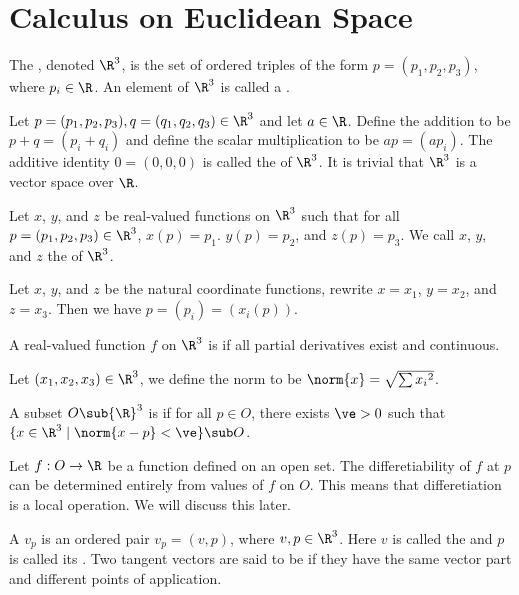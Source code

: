 \documentclass[10pt]{article}
\begin{document}
\hsetup
\htoc
\hmain
\par
\section{Calculus on Euclidean Space}
\begin{definition}
    The , denoted ${\R}^{3}$, is the set of ordered triples of the form $p=({p}_{1},{p}_{2},{p}_{3})$, where ${p}_{i}\in\R$. An element of ${\R}^{3}$ is called a .
\end{definition}
\par
Let $p=({p}_{1},{p}_{2},{p}_{3}),q=({q}_{1},{q}_{2},{q}_{3})\in{\R}^{3}$ and let $a\in\R$. Define the addition to be $p+q=({p}_{i}+{q}_{i})$ and define the scalar multiplication to be $ap=(a{p}_{i})$. The additive identity $0=(0,0,0)$ is called the  of ${\R}^{3}$. It is trivial that ${\R}^{3}$ is a vector space over $\R$.
\begin{definition}
    Let $x$, $y$, and $z$ be real-valued functions on ${\R}^{3}$ such that for all $p=({p}_{1},{p}_{2},{p}_{3})\in{\R}^{3}$, $x(p)={p}_{1}$. $y(p)={p}_{2}$, and $z(p)={p}_{3}$. We call $x$, $y$, and $z$ the  of ${\R}^{3}$.
\end{definition}
\par
Let $x$, $y$, and $z$ be the natural coordinate functions, rewrite $x={x}_{1}$, $y={x}_{2}$, and $z={x}_{3}$. Then we have $p=({p}_{i})=({x}_{i}(p))$.
\begin{definition}
    A real-valued function $f$ on ${\R}^{3}$ is  if all partial derivatives exist and continuous.
\end{definition}
\par
Let $({x}_{1},{x}_{2},{x}_{3})\in{\R}^{3}$, we define the norm to be $\norm{x}=\sqrt{\sum{{x}_{i}}^{2}}$.
\begin{definition}
    A subset $O\sub{\R}^{3}$ is  if for all $p\in O$, there exists $\ve>0$ such that $\{x\in{\R}^{3}\mid\norm{x-p}<\ve\}\sub O$. 
\end{definition}
\par
Let $f:O\to\R$ be a function defined on an open set. The differetiability of $f$ at $p$ can be determined entirely from values of $f$ on $O$. This means that differetiation is a local operation. We will discuss this later.
\begin{definition}
    A  ${v}_{p}$ is an ordered pair ${v}_{p}=(v,p)$, where $v,p\in{\R}^{3}$. Here $v$ is called the  and $p$ is called its . Two tangent vectors are said to be  if they have the same vector part and different points of application.
\end{definition}
\end{document}
